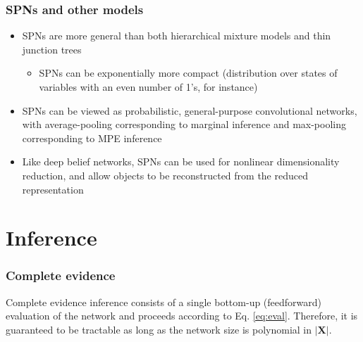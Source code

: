 \documentclass[10pt, t, xcolor={usenames,dvipsnames,svgnames}, compress]{beamer}
\begin{document}
\begin{frame}
\frametitle{SPNs and other models}
\begin{itemize}
\item SPNs are more general than both hierarchical mixture models and thin
  junction trees
\begin{itemize}
\item SPNs can be exponentially more compact (distribution over states of variables
  with an even number of 1’s, for instance)
\end{itemize}
\item SPNs can be viewed as probabilistic, general-purpose convolutional
  networks, with average-pooling corresponding to marginal inference and
  max-pooling corresponding to MPE inference 
\item Like  deep  belief  networks,  SPNs  can  be used for nonlinear
  dimensionality reduction,  and allow objects to be reconstructed from the
  reduced representation
\end{itemize}
\end{frame}

\section{Inference}
{
  \begin{frame}[c]
    \sectionpage
  \end{frame}
}

\begin{frame}
\frametitle{Complete evidence}

Complete evidence inference consists of a single bottom-up
(feedforward) evaluation of the network and proceeds according to
Eq. \ref{eq:eval}.
%
Therefore, it is guaranteed to be tractable
as long as the network size is polynomial in $|\mathbf{X}|$.
\end{frame}
\end{document}
